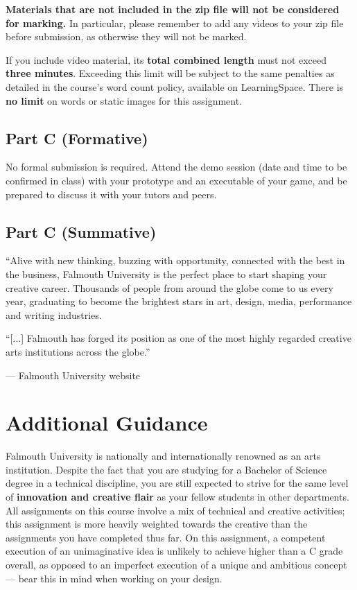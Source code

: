 \documentclass{../fal_assignment}
\begin{document}
\textbf{Materials that are not included in the zip file will not be considered for marking.}
In particular, please remember to add any videos to your zip file before submission,
as otherwise they will not be marked.

If you include video material, its \textbf{total combined length} must not exceed \textbf{three minutes}.
Exceeding this limit will be subject to the same penalties as detailed in the course's word count policy,
available on LearningSpace.
There is \textbf{no limit} on words or static images for this assignment.

\subsection*{Part C (Formative)}

No formal submission is required.
Attend the demo session (date and time to be confirmed in class)
with your prototype and an executable of your game,
and be prepared to discuss it with your tutors and peers.

\subsection*{Part C (Summative)}


\begin{marginquote}
    ``Alive with new thinking, buzzing with opportunity, connected with the best in the business,
    Falmouth University is the perfect place to start shaping your creative career.
    Thousands of people from around the globe come to us every year,
    graduating to become the brightest stars in art, design, media, performance and writing industries.

    ``[...]
    Falmouth has forged its position as one of the most highly regarded creative arts institutions across the globe.''
    
    --- Falmouth University website
\end{marginquote}
\section*{Additional Guidance}

Falmouth University is nationally and internationally renowned as an arts institution.
Despite the fact that you are studying for a Bachelor of Science degree in a technical discipline,
you are still expected to strive for the same level of \textbf{innovation and creative flair}
as your fellow students in other departments.
All assignments on this course involve a mix of technical and creative activities;
this assignment is more heavily weighted towards the creative than the assignments you have completed thus far.
On this assignment, a competent execution of an unimaginative idea is unlikely to achieve higher than a C grade overall,
as opposed to an imperfect execution of a unique and ambitious concept
--- bear this in mind when working on your design.
\end{document}
